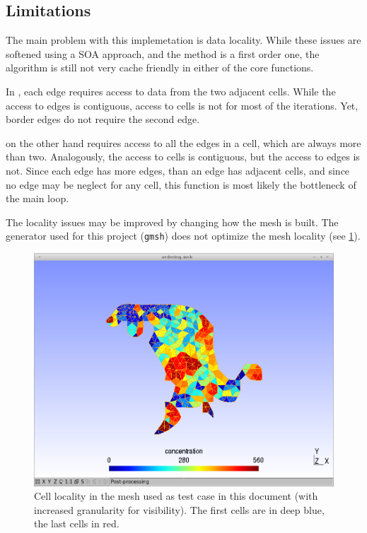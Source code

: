 \subsection{Limitations}

The main problem with this implemetation is data locality. While these issues are softened using a SOA approach, and the method is a first order one, the algorithm is still not very cache friendly in either of the core functions.

In \computeflux, each edge requires access to data from the two adjacent cells. While the access to edges is contiguous, access to cells is not for most of the iterations. Yet, border edges do not require the second edge.

\update on the other hand requires access to all the edges in a cell, which are always more than two. Analogously, the access to cells is contiguous, but the access to edges is not. Since each edge has more edges, than an edge has adjacent cells, and since no edge may be neglect for any cell, this function is most likely the bottleneck of the main loop.

The locality issues may be improved by changing how the mesh is built. The generator used for this project (\texttt{gmsh}) does not optimize the mesh locality (see \cref{fig:locality}).


\begin{figure}[!htp]
	\centering
	\includegraphics[width=\columnwidth]{images/locality_tiny.png}
	\caption{Cell locality in the mesh used as test case in this document (with increased granularity for visibility). The first cells are in deep blue, the last cells in red.}
	\label{fig:locality}
\end{figure}
